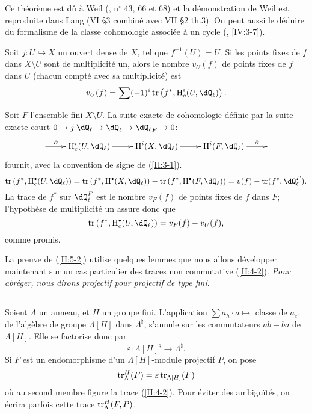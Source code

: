 Ce théorème est dû à Weil (\cite{we48}, n$^\circ$ 43, 66 et 68) et la 
démonstration de Weil est reproduite dans Lang \cite{la83} (VI \S3 combiné 
avec VII \S2 th.3). On peut aussi le déduire du formalisme de la classe 
cohomologie associée à un cycle (, \ref{IV:3-7}). 





\begin{corollary_}\label{II:5-4}
Soit $j:U\hookrightarrow X$ un ouvert dense de $X$, tel que $f^{-1}(U)=U$. Si 
les points fixes de $f$ dans $X\setminus U$ sont de multiplicité un, alors le 
nombre $v_U(f)$ de points fixes de $f$ dans $U$ (chacun compté avec sa 
multiplicité) est 
\[
  v_U(f) = \sum (-1)^i \tr\left(f^*,\h_c^i(U,\dQ_\ell)\right) \text{.}
\]
\end{corollary_}

Soit $F$ l'ensemble fini $X\setminus U$. La suite exacte de cohomologie 
définie par la suite exacte court 
$0\to j_! \dQ_\ell\to\dQ_\ell\to{\dQ_\ell}_F\to 0$: 
\[\xymatrix{
  \ar[r]^-\partial 
    & \h_c^i(U,\dQ_\ell) \ar[r] 
    & \h^i(X,\dQ_\ell) \ar[r] 
    & \h^i(F,\dQ_\ell) \ar[r]^-\partial 
    & 
}\]
fournit, avec la convention de signe de (\ref{II:3-1}). 
\[
  \tr\left(f^*,\h_c^\bullet(U,\dQ_\ell)\right) 
    = \tr\left(f^*,\h^\bullet(X,\dQ_\ell)\right) - \tr\left(f^*,\h^\bullet(F,\dQ_\ell)\right) 
    = v(f) - \tr(f^*,\dQ_\ell^F) \text{.}
\]
La trace de $f^*$ sur $\dQ_\ell^F$ est le nombre $v_F(f)$ de points fixes de 
$f$ dans $F$; l'hypothèse de multiplicité un assure donc que 
\[
  \tr\left(f^*,\h_c^\bullet(U,\dQ_\ell)\right) 
    = v_F(f) - v_U(f) \text{,}
\]
comme promis. 

La preuve de (\ref{II:5-2}) utilise quelques lemmes que nous allons 
développer maintenant sur un cas particulier des traces non commutative 
(\ref{II:4-2}). \emph{Pour abréger, nous dirons projectif pour projectif de 
type fini}. 





\subsection{}\label{II:5-5}

Soient $\Lambda$ un anneau, et $H$ un groupe fini. L'application 
$\sum a_h \cdot a\mapsto $ classe de $a_e$, de l'algèbre de groupe 
$\Lambda[H]$ dans $\Lambda^\natural$, s'annule sur les commutateurs $ab-ba$ de 
$\Lambda[H]$. Elle se factorise donc par 
\[
  \varepsilon : \Lambda[H]^\natural \to \Lambda^\natural \text{.}
\]
Si $F$ est un endomorphisme d'un $\Lambda[H]$-module projectif $P$, on pose 
\[
  \operatorname{tr}_\Lambda^H(F) = \varepsilon \operatorname{tr}_{\Lambda[H]} (F) 
\]
où au second membre figure la trace (\ref{II:4-2}). Pour éviter des 
ambiguïtés, on écrira parfois cette trace $\operatorname{tr}_\Lambda^H(F,P)$. 





